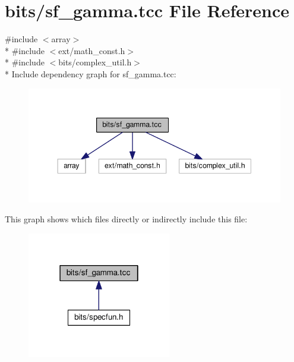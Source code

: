 \hypertarget{sf__gamma_8tcc}{}\section{bits/sf\+\_\+gamma.tcc File Reference}
\label{sf__gamma_8tcc}
{\ttfamily \#include $<$array$>$}\\*
{\ttfamily \#include $<$ext/math\+\_\+const.\+h$>$}\\*
{\ttfamily \#include $<$bits/complex\+\_\+util.\+h$>$}\\*
Include dependency graph for sf\+\_\+gamma.\+tcc\+:
\nopagebreak
\begin{figure}[H]
\begin{center}
\leavevmode
\includegraphics[width=344pt]{sf__gamma_8tcc__incl}
\end{center}
\end{figure}
This graph shows which files directly or indirectly include this file\+:
\nopagebreak
\begin{figure}[H]
\begin{center}
\leavevmode
\includegraphics[width=178pt]{sf__gamma_8tcc__dep__incl}
\end{center}
\end{figure}
